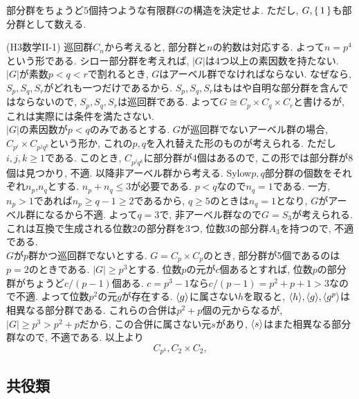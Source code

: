 \begin{egprob}
部分群をちょうど$5$個持つような有限群$G$の構造を決定せよ. ただし, $G,\set{1}$も部分群として数える.
\end{egprob}

\begin{egans} (H3数学II-1)
巡回群$C_n$から考えると, 部分群と$n$の約数は対応する. よって$n=p^4$という形である.
シロー部分群を考えれば, $|G|$は4つ以上の素因数を持たない.
$|G|$が素数$p<q<r$で割れるとき, $G$はアーベル群でなければならない. なぜなら, $S_p,S_q,S_r$がどれも一つだけであるから. $S_{p},S_q,S_r$はもはや自明な部分群を含んではならないので, $S_p,S_q,S_r$は巡回群である. よって$G\cong C_p\times C_q\times C_r$と書けるが, これは実際には条件を満たさない.\\
$|G|$の素因数が$p<q$のみであるとする. $G$が巡回群でないアーベル群の場合, $C_{p^i}\times C_{p^jq^k}$という形か, これの$p,q$を入れ替えた形のものが考えられる. ただし$i,j,k\geq 1$である. このとき, $C_{p^jq^k}$に部分群が4個はあるので, この形では部分群が8個は見つかり, 不適. 以降非アーベル群から考える. Sylow$p,q$部分群の個数をそれぞれ$n_p$,$n_q$とする. $n_p + n_q \leq 3$が必要である. $p<q$なので$n_q = 1$である. 一方, $n_p >1$であれば$n_p \geq q-1\geq 2$であるから, $q\geq 5$のときは$n_q=1$となり, $G$がアーベル群になるから不適. よって$q=3$で, 非アーベル群なので$G=S_3$が考えられる. これは互換で生成される位数2の部分群を3つ, 位数3の部分群$A_3$を持つので, 不適である. \\
$G$が$p$群かつ巡回群でないとする. $G=C_p\times C_p$のとき, 部分群が5個であるのは$p=2$のときである. $|G|\geq p^3$とする. 位数$p$の元が$c$個あるとすれば, 位数$p$の部分群がちょうど$c/(p-1)$個ある. $c=p^3-1$なら$c/(p-1) = p^2+p+1 > 3$なので不適. よって位数$p^2$の元$g$が存在する. $\langle g \rangle $に属さない$h$を取ると, $\langle h \rangle, \langle g \rangle, \langle g^p \rangle $は相異なる部分群である. これらの合併は$p^2 + p$個の元からなるが, $|G|\geq p^3 > p^2 + p$だから, この合併に属さない元$s$があり, $\langle s\rangle$はまた相異なる部分群なので, 不適である. 以上より
\[C_{p^4}, C_{2}\times C_{2}, \]
\end{egans}



\newpage
\subsection{共役類}

